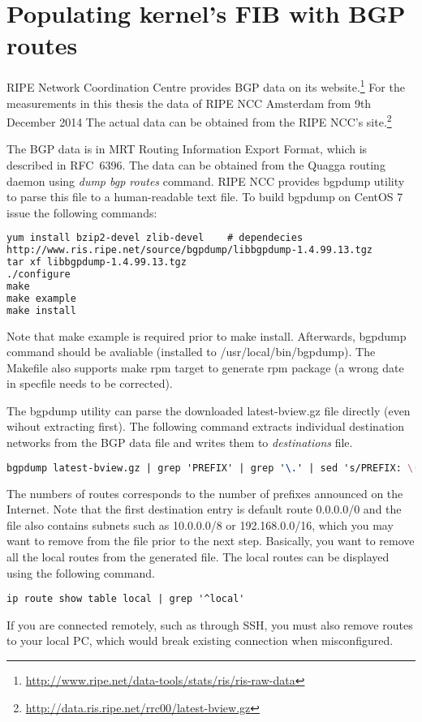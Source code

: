 
\chapter{Populating kernel's FIB with BGP routes}\label{app:bgp}
RIPE Network Coordination Centre provides BGP data on its
website.\footnote{{\url{http://www.ripe.net/data-tools/stats/ris/ris-raw-data}}}
For the measurements in this thesis the data of RIPE NCC Amsterdam from 9th December 2014
The actual data can be obtained from the RIPE NCC's
site.\footnote{{\url{http://data.ris.ripe.net/rrc00/latest-bview.gz}}}

The BGP data is in MRT Routing Information Export Format, which is described in RFC~6396.
The data can be obtained from the Quagga routing daemon
using {\it{dump bgp routes}} command.
RIPE NCC provides bgpdump utility to parse this file to a human-readable text file.
To build bgpdump on CentOS 7 issue the following commands:
\begin{lstlisting}[language=TeX]
yum install bzip2-devel zlib-devel    # dependecies
http://www.ris.ripe.net/source/bgpdump/libbgpdump-1.4.99.13.tgz
tar xf libbgpdump-1.4.99.13.tgz
./configure
make
make example
make install
\end{lstlisting}
Note that make example is required prior to make install.
Afterwards, bgpdump command should be avaliable (installed to /usr/local/bin/bgpdump).
The Makefile also supports make rpm target to generate rpm package (a wrong date in specfile needs to be corrected).

The bgpdump utility can parse the downloaded latest-bview.gz file directly (even wihout extracting first).
The following command extracts individual destination networks from the BGP data file and writes them to {\it{destinations}} file.
\begin{lstlisting}[language=TeX]
bgpdump latest-bview.gz | grep 'PREFIX' | grep '\.' | sed 's/PREFIX: \(.*\)/\1/' | grep -v '0.0.0.0/0' | uniq > destinations
\end{lstlisting}
The numbers of routes corresponds to the number of prefixes announced on the Internet.
Note that the first destination entry is default route 0.0.0.0/0 and the file also contains subnets such as 10.0.0.0/8 or 192.168.0.0/16,
which you may want to remove from the file prior to the next step.
Basically, you want to remove all the local routes from the generated file.
The local routes can be displayed using the following command.
\begin{lstlisting}
ip route show table local | grep '^local'
\end{lstlisting}
If you are connected remotely, such as through SSH,
you must also remove routes to your local PC, which would break existing connection when misconfigured.

